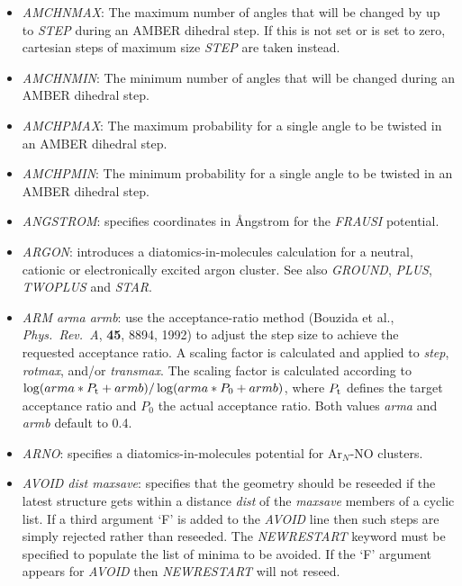 \documentclass[12pt,a4paper,dvips]{article}
\begin{document}
\begin{itemize}
\item {\it AMCHNMAX\/}: The maximum number of angles that will be changed by up to {\it STEP\/} during an 
AMBER dihedral step. If this is not set or is set to zero, cartesian steps of maximum size {\it STEP\/} are taken 
instead. 

\item {\it AMCHNMIN\/}: The minimum number of angles that will be changed during an AMBER dihedral step.

\item {\it AMCHPMAX\/}: The maximum probability for a single angle to be twisted in an AMBER dihedral step.

\item {\it AMCHPMIN\/}: The minimum probability for a single angle to be twisted in an AMBER dihedral step.

\item {\it ANGSTROM\/}: specifies coordinates in \AA ngstrom for the {\it FRAUSI\/}
potential.

\item {\it ARGON\/}: introduces a diatomics-in-molecules calculation for
a neutral, cationic or electronically excited argon cluster. See also
{\it GROUND\/}, {\it PLUS\/}, {\it TWOPLUS\/} and {\it STAR\/}.

\item{\it ARM arma armb}: use the acceptance-ratio method (Bouzida et al., {\it Phys.~Rev.~A},
{\bf 45}, 8894, 1992)  to adjust the step size to achieve the requested 
acceptance ratio. A scaling factor is calculated and applied to {\it step}, {\it rotmax},
and/or {\it transmax}. The scaling factor is calculated according to 
$\log(arma*P_{\rm t}+armb)/\log(arma*P_0+armb)$, where $P_{\rm t}$ defines the
target acceptance ratio and $P_0$ the actual acceptance ratio. Both values {\it arma} and
{\it armb} default to 0.4.

\item {\it ARNO\/}: specifies a diatomics-in-molecules potential for Ar$_N$-NO clusters.

\item {\it AVOID dist maxsave}: specifies that the geometry should be reseeded if the
latest structure gets within a distance {\it dist} of the {\it maxsave} members of a
cyclic list. If a third argument `F' is added to the {\it AVOID\/} line then such 
steps are simply rejected rather than reseeded.
The {\it NEWRESTART\/} keyword must be specified to populate the list of
minima to be avoided. If the `F' argument appears for {\it AVOID\/} then
{\it NEWRESTART\/} will not reseed.


\end{itemize}
\end{document}
